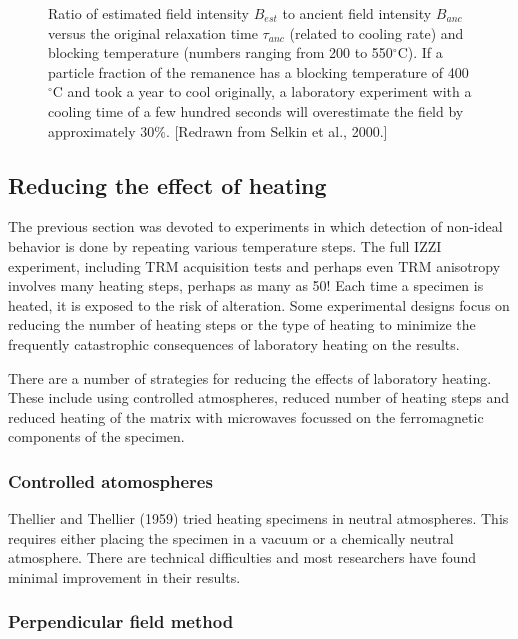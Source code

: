\begin{figure}[htb]
\epsfxsize 10cm
\centering {}
\caption{Ratio of estimated field intensity $B_{est}$ to ancient field intensity $B_{anc}$ versus the original relaxation time $\tau_{anc} $ (related to cooling rate)  and blocking temperature (numbers ranging from 200 to 550$^{\circ}$C).  If a particle fraction of the remanence has a blocking temperature of 400$^{\circ}$C and took a year to cool originally, a laboratory experiment with a cooling time of a few hundred seconds will overestimate the field by approximately 30\%. [Redrawn from Selkin et al., 2000.] }
\label{fig:coolingrate}
\end{figure} \nocite{selkin00b}

\subsection{Reducing the effect of heating}

The previous section was devoted to experiments in which detection of non-ideal behavior is done by repeating various temperature steps.   The full IZZI experiment, including TRM acquisition tests and perhaps even TRM anisotropy involves many heating steps, perhaps as many as 50!  Each time a specimen is heated, it is exposed to the risk of alteration.   Some experimental designs focus on reducing the number of heating steps or the type of heating to minimize the frequently catastrophic consequences of laboratory heating on the results.   

There are a number of strategies for reducing the effects of laboratory heating.    These include using controlled atmospheres, reduced number of heating steps and reduced heating of the matrix with microwaves focussed on the ferromagnetic components of the specimen.  
\eject

\subsubsection{Controlled atomospheres}

Thellier and Thellier (1959) tried heating specimens in neutral atmospheres.  This requires either placing the specimen in a vacuum or a chemically neutral atmosphere.  There are technical difficulties and most researchers have found minimal improvement in their results.   

\subsubsection{Perpendicular field method}

